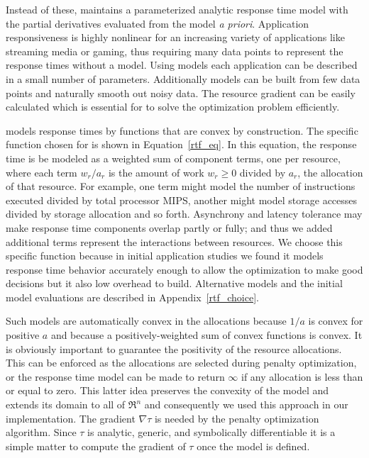 Instead of these, \pacora maintains a parameterized analytic response time model with the partial derivatives evaluated from the model \emph{a priori}. Application responsiveness is highly nonlinear for an increasing variety of applications like streaming media or gaming, thus requiring many data points to represent the response times without a model. Using models each application can be described in a small number of parameters.  Additionally models can be built from few data points and naturally smooth out noisy data. The resource gradient can be easily calculated which is essential for \pacora to solve the optimization problem efficiently.

\pacora models response times by functions that are convex by construction.  The specific function chosen for \pacora is shown in Equation~\ref{rtf_eq}.  In this equation, the response time is be modeled as a weighted sum of component terms, one per resource, where each term $w_r/a_r$ is the amount of work $w_r \geq 0$ divided by $a_r$, the allocation of that resource\cite{Snav}. For example, one term might model the number of instructions executed divided by total processor MIPS, another might model storage accesses divided by storage allocation and so forth. Asynchrony and latency tolerance may make response time components overlap partly or fully; and thus we added additional terms represent the interactions between resources. We choose this specific function because in initial application studies we found it models response time behavior accurately enough to allow the optimization to make good decisions but it also low overhead to build.  Alternative models and the initial model evaluations are described in Appendix~\ref{rtf_choice}.

Such models are automatically convex in the allocations because $1/a$ is convex for positive $a$ and because a positively-weighted sum of convex functions is convex.  It is obviously important to guarantee the positivity of the resource allocations. This can be enforced as the allocations are selected during penalty optimization, or the response time model can be made to return $\infty$ if any allocation is less than or equal to zero. This latter idea preserves the convexity of the model and extends its domain to all of $\Re^n$ and consequently we used this approach in our implementation. The gradient $\nabla\tau$ is needed by the penalty optimization algorithm.
Since $\tau$ is analytic, generic, and symbolically differentiable
it is a simple matter to compute the gradient of $\tau$ once the model is defined.

